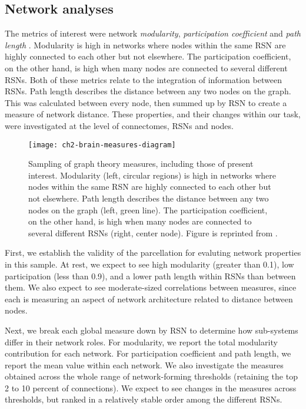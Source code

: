 \subsection{Network analyses}

The metrics of interest were network \textit{modularity}, \textit{participation coefficient} and \textit{path length} \citep{Rubinov2010}. Modularity is high in networks where nodes within the same RSN are highly connected to each other but not elsewhere. The participation coefficient, on the other hand, is high when many nodes are connected to several different RSNs. Both of these metrics relate to the integration of information between RSNs. Path length describes the distance between any two nodes on the graph. This was calculated between every node, then summed up by RSN to create a measure of network distance. These properties, and their changes within our task, were investigated at the level of connectomes, RSNs and nodes. 

\begin{figure}[t]
    \centering
    \texttt{[image: ch2-brain-measures-diagram]}
    \caption[Sampling of graph theory measures]{Sampling of graph theory measures, including those of present interest. Modularity (left, circular regions) is high in networks where nodes within the same RSN are highly connected to each other but not elsewhere. Path length describes the distance between any two nodes on the graph (left, green line). The participation coefficient, on the other hand, is high when many nodes are connected to several different RSNs (right, center node). Figure is reprinted from \citep{Rubinov2010}.}
    \label{fig:ch2-brain-measures-diagram}
\end{figure}

First, we establish the validity of the parcellation for evaluting network properties in this sample. At rest, we expect to see high modularity (greater than 0.1), low participation (less than 0.9), and a lower path length within RSNs than between them. We also expect to see moderate-sized correlations between measures, since each is measuring an aspect of network architecture related to distance between nodes.  

Next, we break each global measure down by RSN to determine how sub-systems differ in their network roles. For modularity, we report the total modularity contribution for each network. For participation coefficient and path length, we report the mean value within each network. We also investigate the measures obtained across the whole range of network-forming thresholds (retaining the top 2 to 10 percent of connections). We expect to see changes in the measures across thresholds, but ranked in a relatively stable order among the different RSNs. 

